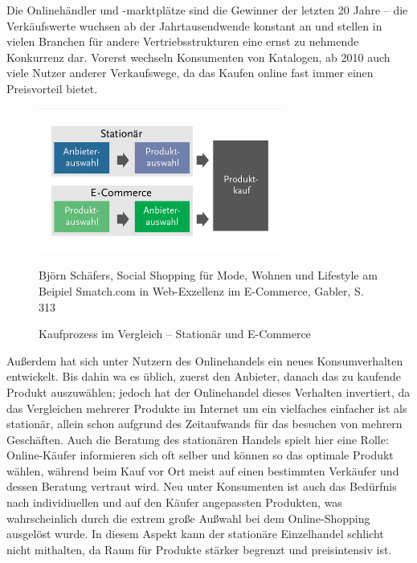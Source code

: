 Die Onlinehändler und -marktplätze sind die Gewinner der letzten 20 Jahre – die Verkäufswerte wuchsen ab der Jahrtausendwende konstant an und stellen in vielen Branchen für andere Vertriebsstrukturen eine ernst zu nehmende Konkurrenz dar\cite{wolf}. Vorerst wechseln Konsumenten von Katalogen, ab 2010 auch viele Nutzer anderer Verkaufswege, da das Kaufen online fast immer einen Preisvorteil bietet\cite[S. 31]{Graf}.
\begin{figure}[h]
    \begin{center}
        \includegraphics[width=8cm]{media/Fabian-konsumwandel.png}
        \caption{Kaufprozess im Vergleich – Stationär und E-Commerce}
        \label{konsumwandel}
        \bildquelle Björn Schäfers, Social Shopping für Mode, Wohnen und Lifestyle am Beipiel Smatch.com in Web-Exzellenz im E-Commerce, Gabler, S. 313 %
    \end{center}
\end{figure} 
Außerdem hat sich unter Nutzern des Onlinehandels ein neues Konsumverhalten entwickelt. Bis dahin wa es üblich, zuerst den Anbieter, danach das zu kaufende Produkt auszuwählen; jedoch hat der Onlinehandel dieses Verhalten invertiert, da das Vergleichen mehrerer Produkte im Internet um ein vielfaches einfacher ist als stationär, allein schon aufgrund des Zeitaufwands für das besuchen von mehrern Geschäften\cite[S 22f]{Graf}. Auch die Beratung des stationären Handels spielt hier eine Rolle: Online-Käufer informieren sich oft selber und können so das optimale Produkt wählen, während beim Kauf vor Ort meist auf einen bestimmten Verkäufer und dessen Beratung vertraut wird\cite[S. 15f]{evilcom}.
Neu unter Konsumenten ist auch das Bedürfnis nach individiuellen und auf den Käufer angepassten Produkten\cite[S. 43]{Nitt}, was wahrscheinlich durch die extrem große Außwahl bei dem Online-Shopping ausgelöst wurde. In diesem Aspekt kann der stationäre Einzelhandel schlicht nicht mithalten, da Raum für Produkte stärker begrenzt und preisintensiv ist. 


